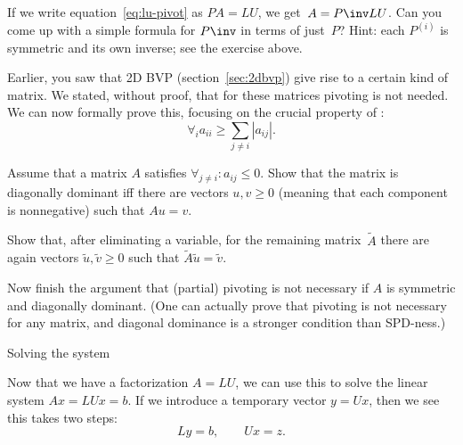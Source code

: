 \begin{exercise}
  If we write equation~\eqref{eq:lu-pivot} as $PA=LU$, we get~$A=P\inv
  LU$. Can you come up with a simple formula for $P\inv$ in terms of
  just~$P$? Hint: each $P^{(i)}$ is symmetric and its own inverse; see
  the exercise above.
\end{exercise}

\begin{exercise}
  \label{ex:no-pivot}
  Earlier, you saw that 2D \acs{BVP} (section~\ref{sec:2dbvp}) give
  rise to a certain kind of matrix. We stated, without proof, that for
  these matrices pivoting is not needed. We can now formally prove
  this, focusing on the crucial property of :
  \[ \forall_i a_{ii}\geq\sum_{j\not=i}|a_{ij}|. \]

  Assume that a matrix $A$ satisfies
  $\forall_{j\not=i}\colon a_{ij}\leq 0$. Show that the matrix is
  diagonally dominant iff there are vectors
  $u,v\geq0$ (meaning that each component is nonnegative) such that
  $Au=v$.

  Show that, after eliminating a variable, for the remaining
  matrix~$\tilde A$ there are again vectors $\tilde u,\tilde v\geq0$
  such that $\tilde A\tilde u=\tilde v$.

  Now finish the argument that (partial) pivoting is not necessary if
  $A$ is symmetric and diagonally dominant. (One can actually prove
  that pivoting is not necessary for any  matrix, and
  diagonal dominance is a stronger condition than \ac{SPD}-ness.)
\end{exercise}


 {Solving the system}
\label{sec:lu-solve}

Now that we have a factorization $A=LU$, we can use this to solve the
linear system $Ax=LUx=b$. If we introduce a temporary vector $y=Ux$,
then we see this takes two steps:
\[ Ly=b,\qquad Ux=z. \]

